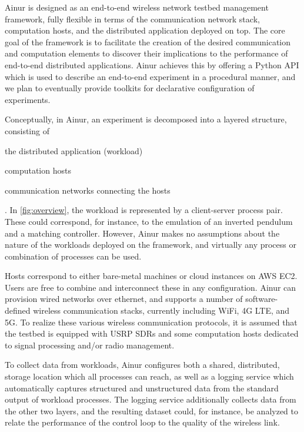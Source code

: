 Ainur is designed as an end-to-end wireless network testbed management framework, fully flexible in terms of the communication network stack, computation hosts, and the distributed application deployed on top.
The core goal of the framework is to facilitate the creation of the desired communication and computation elements to discover their implications to the performance of end-to-end distributed applications.
Ainur achieves this by offering a Python \ac{API} which is used to describe an end-to-end experiment in a procedural manner, and we plan to eventually provide toolkits for declarative configuration of experiments.

Conceptually, in Ainur, an experiment is decomposed into a layered structure, consisting of
\begin{enumerate*}[itemjoin={{; }}, itemjoin*={{; and }}]
    \item the distributed application (workload)
    \item computation hosts
    \item communication networks connecting the hosts
\end{enumerate*}.
In \cref{fig:overview}, the workload is represented by a client-server process pair.
These could correspond, for instance, to the emulation of an inverted pendulum and a matching controller.
However, Ainur makes no assumptions about the nature of the workloads deployed on the framework, and virtually any process or combination of processes can be used.

Hosts correspond to either bare-metal machines or cloud instances on \ac{AWS} \ac{EC2}.
Users are free to combine and interconnect these in any configuration.
Ainur can provision wired networks over ethernet, and supports a number of software-defined wireless communication stacks, currently including WiFi, 4G \ac{LTE}, and 5G.
To realize these various wireless communication protocols, it is assumed that the testbed is equipped with \ac{USRP} \ac{SDR}s and some computation hosts dedicated to signal processing and/or radio management.

To collect data from workloads, Ainur configures both a shared, distributed, storage location which all processes can reach, as well as a logging service which automatically captures structured and unstructured data from the standard output of workload processes.
The logging service additionally collects data from the other two layers, and the resulting dataset could, for instance, be analyzed to relate the performance of the control loop to the quality of the wireless link. 

